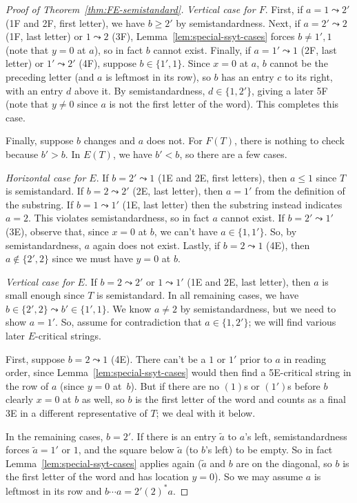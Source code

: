 \documentclass[10pt]{amsart}
\theoremstyle{definition}
\begin{document}
\begin{proof}[Proof of Theorem~\ref{thm:FE-semistandard}]
\emph{Vertical case for $F$}. 
First, if $a = 1 \leadsto 2'$ (1F and 2F, first letter), we have $b \geq 2'$ by semistandardness. Next, if $a = 2' \leadsto 2$ (1F, last letter) or $1 \leadsto 2$ (3F), Lemma~\ref{lem:special-ssyt-cases} forces $b \ne 1',1$ (note that $y=0$ at $a$), so in fact $b$ cannot exist. Finally, if $a = 1' \leadsto 1$ (2F, last letter) or $1' \leadsto 2'$ (4F), suppose $b \in \{1',1\}$. Since $x=0$ at $a$, $b$ cannot be the preceding letter (and $a$ is leftmost in its row), so $b$ has an entry $c$ to its right, with an entry $d$ above it. By semistandardness, $d \in \{1,2'\}$, giving a later 5F (note that $y\ne0$ since $a$ is not the first letter of the word). This completes this case.

Finally, suppose $b$ changes and $a$ does not. For $F(T)$, there is nothing to check because $b' > b$. In $E(T)$, we have $b' < b$, so there are a few cases.

\emph{Horizontal case for $E$}. If $b = 2' \leadsto 1$ (1E and 2E, first letters), then $a \leq 1$ since $T$ is semistandard. If $b = 2 \leadsto 2'$ (2E, last letter), then $a = 1'$ from the definition of the substring. If $b = 1 \leadsto 1'$ (1E, last letter) then the substring instead indicates $a=2$. This violates semistandardness, so in fact $a$ cannot exist. If $b = 2' \leadsto 1'$ (3E), observe that, since $x=0$ at $b$, we can't have $a \in \{1,1'\}$. So, by semistandardness, $a$ again does not exist. Lastly, if $b = 2 \leadsto 1$ (4E), then $a \notin \{2',2\}$ since we must have $y=0$ at $b$. 

\emph{Vertical case for $E$}. If $b = 2 \leadsto 2'$ or $1 \leadsto 1'$ (1E and 2E, last letter), then $a$ is small enough since $T$ is semistandard. In all remaining cases, we have $b \in \{2',2\} \leadsto b' \in \{1',1\}$. We know $a \ne 2$ by semistandardness, but we need to show $a = 1'$. So, assume for contradiction that $a \in \{1,2'\}$; we will find various later $E$-critical strings.

First, suppose $b = 2 \leadsto 1$ (4E). There can't be a $1$ or $1'$ prior to $a$ in reading order, since Lemma~\ref{lem:special-ssyt-cases} would then find a 5E-critical string in the row of $a$ (since $y=0$ at~$b$). But if there are no $(1)$s or $(1')$s before $b$ clearly $x=0$ at $b$ as well, so $b$ is the first letter of the word and counts as a final 3E in a different representative of $T$; we deal with it below.

In the remaining cases, $b = 2'$. If there is an entry $\tilde{a}$ to $a$'s left, semistandardness forces $\tilde{a} = 1'$ or $1$, and the square below $\tilde{a}$ (to $b$'s left) to be empty. So in fact Lemma~\ref{lem:special-ssyt-cases} applies again ($\tilde{a}$ and $b$ are on the diagonal, so $b$ is the first letter of the word and has location $y=0$). So we may assume $a$ is leftmost in its row and $b \cdots a = 2' (2)^* a$.


\end{proof}
\end{document}
